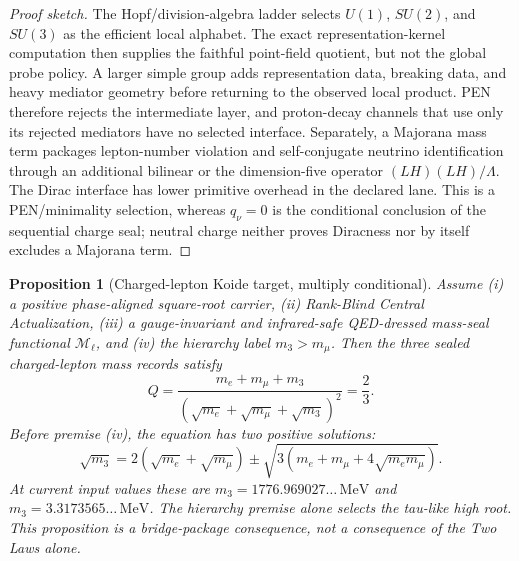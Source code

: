 \documentclass[11pt]{article}
\theoremstyle{plain}
\newtheorem{proposition}[theorem]{Proposition}
\theoremstyle{definition}
\theoremstyle{remark}
\newenvironment{proofsketch}{\begin{proof}[Proof sketch]}{\end{proof}}
\begin{document}
\begin{proofsketch}
The Hopf/division-algebra ladder selects \(U(1)\), \(SU(2)\), and \(SU(3)\) as the efficient local alphabet. The exact representation-kernel computation then supplies the faithful point-field quotient, but not the global probe policy. A larger simple group adds representation data, breaking data, and heavy mediator geometry before returning to the observed local product. PEN therefore rejects the intermediate layer, and proton-decay channels that use only its rejected mediators have no selected interface. Separately, a Majorana mass term packages lepton-number violation and self-conjugate neutrino identification through an additional bilinear or the dimension-five operator \((LH)(LH)/\Lambda\). The Dirac interface has lower primitive overhead in the declared lane. This is a PEN/minimality selection, whereas \(q_\nu=0\) is the conditional conclusion of the sequential charge seal; neutral charge neither proves Diracness nor by itself excludes a Majorana term.
\end{proofsketch}

\begin{proposition}[Charged-lepton Koide target, multiply conditional]
Assume (i) a positive phase-aligned square-root carrier, (ii) Rank-Blind Central Actualization, (iii) a gauge-invariant and infrared-safe QED-dressed mass-seal functional \(\mathcal M_\ell\), and (iv) the hierarchy label \(m_3>m_\mu\). Then the three sealed charged-lepton mass records satisfy
\[
Q=\frac{m_e+m_\mu+m_3}{\left(\sqrt{m_e}+\sqrt{m_\mu}+\sqrt{m_3}\right)^2}=\frac{2}{3}.
\]
Before premise (iv), the equation has two positive solutions:
\[
\sqrt{m_3}
=2\left(\sqrt{m_e}+\sqrt{m_\mu}\right)
\pm
\sqrt{3\left(m_e+m_\mu+4\sqrt{m_em_\mu}\right)}.
\]
At current input values these are \(m_3=1776.969027\ldots\,\mathrm{MeV}\) and \(m_3=3.3173565\ldots\,\mathrm{MeV}\).  The hierarchy premise alone selects the tau-like high root.  This proposition is a bridge-package consequence, not a consequence of the Two Laws alone.
\end{proposition}
\end{document}
